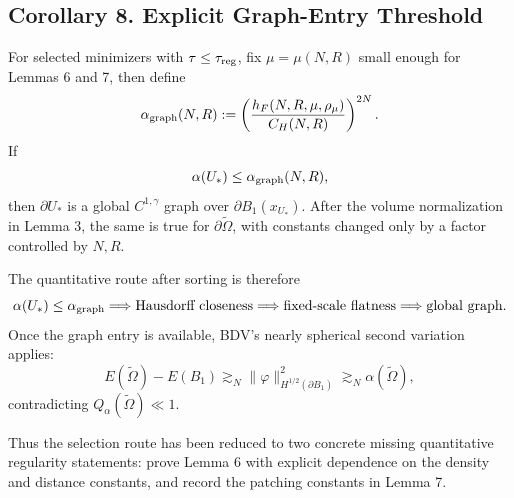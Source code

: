 \documentclass[11pt]{article}
\begin{document}
\subsection*{Corollary 8. Explicit Graph-Entry Threshold}

For selected minimizers with \(\tau\le\tau_{\rm reg}\), fix \(\mu=\mu(N,R)\)
small enough for Lemmas 6 and 7, then define
\[
\alpha_{\rm graph}(N,R)
:=
\left(\frac{h_F(N,R,\mu,\rho_\mu)}{C_H(N,R)}\right)^{2N}.
\]
If
\[
\alpha(U_*)\le\alpha_{\rm graph}(N,R),
\]
then \(\partial U_*\) is a global \(C^{1,\gamma}\) graph over
\(\partial B_1(x_{U_*})\). After the volume normalization in Lemma 3, the same
is true for \(\partial\widetilde\Omega\), with constants changed only by a
factor controlled by \(N,R\).

The quantitative route after sorting is therefore
\[
\alpha(U_*)\le\alpha_{\rm graph}
\Longrightarrow
\hbox{Hausdorff closeness}
\Longrightarrow
\hbox{fixed-scale flatness}
\Longrightarrow
\hbox{global graph}.
\]
Once the graph entry is available, BDV's nearly spherical second variation
applies:
\[
E(\widetilde\Omega)-E(B_1)
\gtrsim_N
\|\varphi\|_{H^{1/2}(\partial B_1)}^2
\gtrsim_N
\alpha(\widetilde\Omega),
\]
contradicting \(Q_\alpha(\widetilde\Omega)\ll1\).

Thus the selection route has been reduced to two concrete missing quantitative
regularity statements: prove Lemma 6 with explicit dependence on the density
and distance constants, and record the patching constants in Lemma 7.
\end{document}
